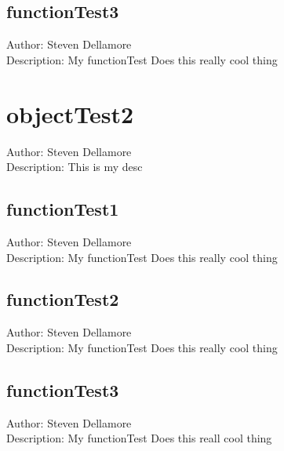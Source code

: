 \documentclass[12pt]{article}
\begin{document}
\subsection{functionTest3}
Author: Steven Dellamore \\
Description: My functionTest Does this really cool thing \\



\section{objectTest2}
Author: Steven Dellamore \\
Description: This is my desc \\



\subsection{functionTest1}
Author: Steven Dellamore \\
Description: My functionTest Does this really cool thing \\



\subsection{functionTest2}
Author: Steven Dellamore \\
Description: My functionTest Does this really cool thing \\



\subsection{functionTest3}
Author: Steven Dellamore \\
Description: My functionTest Does this reall cool thing \\
\end{document}
